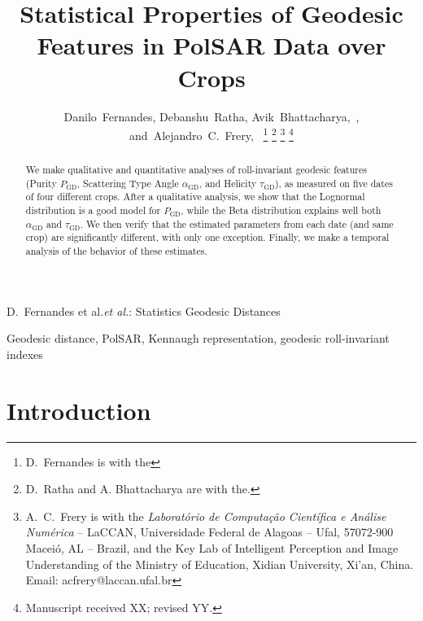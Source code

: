 \documentclass[journal]{IEEEtran}
\begin{document}
\title{Statistical Properties of Geodesic Features in PolSAR Data over Crops}

\author{Danilo~Fernandes,
        Debanshu~Ratha,
        Avik~Bhattacharya,~,
        and~Alejandro~C.~Frery,~%
\thanks{D.\ Fernandes is with the}%
\thanks{D.\ Ratha and A. Bhattacharya are with the.}%
\thanks{A.\ C.\ Frery is with the \textit{Laborat\'orio de Computa\c c\~ao Cient\'ifica e An\'alise Num\'erica} -- LaCCAN, 
	Universidade Federal de Alagoas -- Ufal, 
	57072-900 Macei\'o, AL -- Brazil, and the Key Lab of Intelligent Perception and Image Understanding of the Ministry of Education, Xidian University, Xi'an, China. Email: acfrery@laccan.ufal.br}
\thanks{Manuscript received XX; revised YY.}}

%
{D.\ Fernandes et al.\MakeLowercase{\textit{et al.}}: Statistics Geodesic Distances}

\maketitle

\begin{abstract}
We make qualitative and quantitative analyses of roll-invariant geodesic features (Purity $P_{\text{GD}}$, Scattering Type Angle $\alpha_{\text{GD}}$, and Helicity $\tau_{\text{GD}}$), as measured on five dates of four different crops.
After a qualitative analysis, we show that the Lognormal distribution is a good model for $P_{\text{GD}}$, while the Beta distribution explains well both $\alpha_{\text{GD}}$ and $\tau_{\text{GD}}$.
We then verify that the estimated parameters from each date (and same crop) are significantly different, with only one exception.
Finally, we make a temporal analysis of the behavior of these estimates.
\end{abstract}

\begin{IEEEkeywords}
Geodesic distance, PolSAR, Kennaugh representation, geodesic roll-invariant indexes
\end{IEEEkeywords}

\IEEEpeerreviewmaketitle



\section{Introduction}
\end{document}
